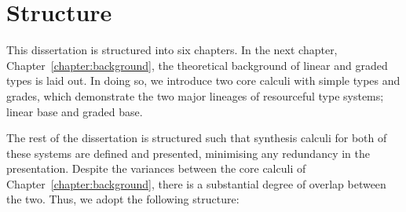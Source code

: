 \section{Structure}

This dissertation is structured into six chapters. In the next chapter,
Chapter~\ref{chapter:background}, the theoretical background of linear and
graded types is laid out. In doing so, we introduce two core calculi with simple
types and grades, which demonstrate the two major lineages of resourceful type
systems; linear base and graded base.

The rest of the dissertation is structured such that synthesis calculi for both
of these systems are defined and presented, minimising any redundancy in the
presentation. Despite the variances between the core calculi
of Chapter~\ref{chapter:background}, there is a substantial degree of overlap between
the two. Thus, we adopt the following structure: 
